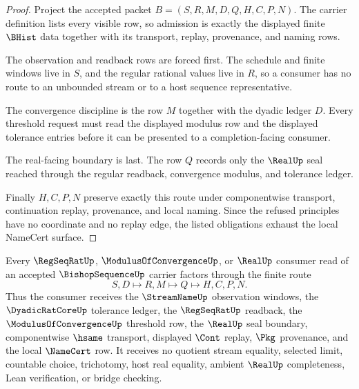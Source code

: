 \begin{proof}
Project the accepted packet $B=(S,R,M,D,Q,H,C,P,N)$. The carrier definition lists every visible row, so admission is exactly the displayed finite $\BHist$ data together with its transport, replay, provenance, and naming rows.

The observation and readback rows are forced first. The schedule and finite windows live in $S$, and the regular rational values live in $R$, so a consumer has no route to an unbounded stream or to a host sequence representative.

The convergence discipline is the row $M$ together with the dyadic ledger $D$. Every threshold request must read the displayed modulus row and the displayed tolerance entries before it can be presented to a completion-facing consumer.

The real-facing boundary is last. The row $Q$ records only the $\RealUp$ seal reached through the regular readback, convergence modulus, and tolerance ledger.

Finally $H,C,P,N$ preserve exactly this route under componentwise transport, continuation replay, provenance, and local naming. Since the refused principles have no coordinate and no replay edge, the listed obligations exhaust the local NameCert surface.
\end{proof}

\begin{theorem}
\label{thm:bishop-sequence-streamname-real-route}
Every $\RegSeqRatUp$, $\ModulusOfConvergenceUp$, or $\RealUp$ consumer read of an accepted $\BishopSequenceUp$ carrier factors through the finite route
$$
S,D \longmapsto R,M \longmapsto Q \longmapsto H,C,P,N .
$$
Thus the consumer receives the $\StreamNameUp$ observation windows, the $\DyadicRatCoreUp$ tolerance ledger, the $\RegSeqRatUp$ readback, the $\ModulusOfConvergenceUp$ threshold row, the $\RealUp$ seal boundary, componentwise $\hsame$ transport, displayed $\Cont$ replay, $\Pkg$ provenance, and the local $\NameCert$ row. It receives no quotient stream equality, selected limit, countable choice, trichotomy, host real equality, ambient $\RealUp$ completeness, Lean verification, or bridge checking.
\end{theorem}

